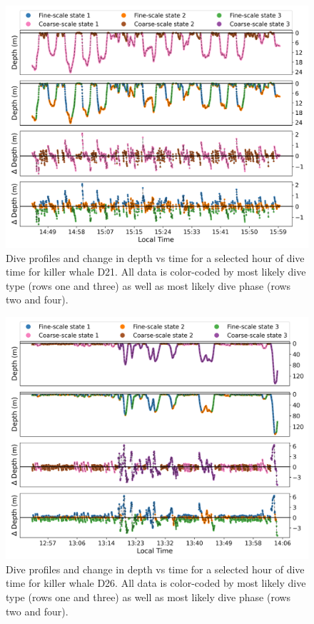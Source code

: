 \documentclass[12pt]{article}
\begin{document}
\begin{figure}[H]
    \centering
    \includegraphics[width=6.5in]{../plt/decoded_dives_kw_D21_K_3_3_nWhales_8.png}
    \caption{Dive profiles and change in depth vs time for a selected hour of dive time for killer whale D21. All data is color-coded by most likely dive type (rows one and three) as well as most likely dive phase (rows two and four).}
    \label{fig:D21}
\end{figure}

\begin{figure}[H]
    \centering
    \includegraphics[width=6.5in]{../plt/decoded_dives_kw_D26_K_3_3_nWhales_8.png}
    \caption{Dive profiles and change in depth vs time for a selected hour of dive time for killer whale D26. All data is color-coded by most likely dive type (rows one and three) as well as most likely dive phase (rows two and four).}
    \label{fig:D26}
\end{figure}
\end{document}
